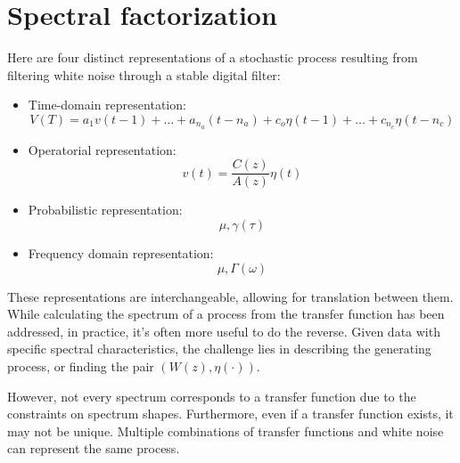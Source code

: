 \section{Spectral factorization}

Here are four distinct representations of a stochastic process resulting from filtering white noise through a stable digital filter:
\begin{itemize}
    \item Time-domain representation: 
        \[V(T)=a_1v(t-1)+\dots+a_{n_a}(t-n_a)+c_o\eta(t-1)+\dots+c_{n_c}\eta(t-n_c)\]
    \item Operatorial representation: 
        \[v(t)=\dfrac{C(z)}{A(z)}\eta(t)\]
    \item Probabilistic representation:
        \[\mu,\gamma(\tau)\]
    \item Frequency domain representation:
        \[\mu,\Gamma(\omega)\]
\end{itemize}
These representations are interchangeable, allowing for translation between them. 
While calculating the spectrum of a process from the transfer function has been addressed, in practice, it's often more useful to do the reverse. 
Given data with specific spectral characteristics, the challenge lies in describing the generating process, or finding the pair $(W(z), \eta(\cdot))$.

However, not every spectrum corresponds to a transfer function due to the constraints on spectrum shapes. 
Furthermore, even if a transfer function exists, it may not be unique. 
Multiple combinations of transfer functions and white noise can represent the same process.

